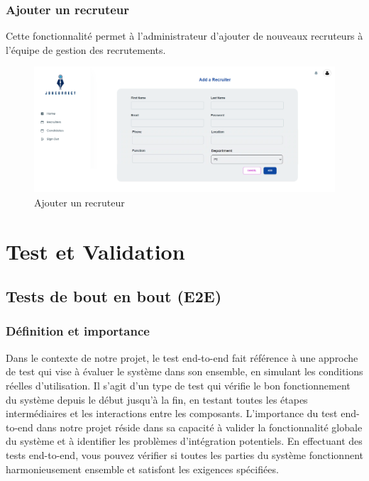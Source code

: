\subsubsection{Ajouter un recruteur}

Cette fonctionnalité permet à l'administrateur d'ajouter de nouveaux recruteurs à l'équipe de gestion des recrutements.
\begin{figure}[htbp]
   \centering
   \includegraphics[scale=0.2]{screens/addRecruiter.png} 
   \caption{Ajouter un recruteur}
   \label{fig:addRec}
\end{figure}




\section{Test et Validation}

\subsection{Tests de bout en bout (E2E)}
\subsubsection{Définition et importance}

Dans le contexte de notre projet, le test end-to-end fait référence à une approche de test qui vise à évaluer le système dans son ensemble, en simulant les conditions réelles d’utilisation. Il s’agit d’un type de test qui vérifie le bon fonctionnement du système depuis le début jusqu’à la fin, en testant toutes les étapes intermédiaires et les  interactions entre les  composants. L’importance du test end-to-end dans notre projet réside dans sa capacité  à valider  la fonctionnalité globale du système et à identifier les problèmes d’intégration potentiels. En effectuant des tests end-to-end, vous pouvez vérifier si toutes les parties du système fonctionnent harmonieusement ensemble et satisfont les exigences spécifiées.
\newline

